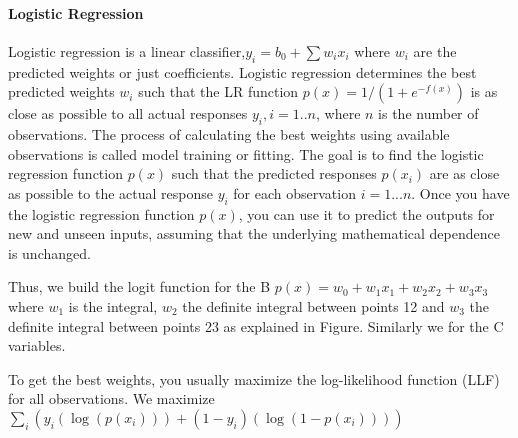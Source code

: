 \documentclass[11pt]{article}
\begin{document}
\paragraph*{Logistic Regression }
Logistic regression is a linear classifier,$y_i = b_0 + \sum w_i x_i $ where $w_i$ are the predicted weights or just coefficients.
Logistic regression determines the best predicted weights $w_i$ such that the LR function $p(x) = 1/(1 + e^{-f(x)})$ is as close as possible to all actual responses $y_i, i=1..n$, where $n$ is the number of observations. 
The process of calculating the best weights using available observations is called model training or fitting.
The goal is to find the logistic regression function $p(x)$ such that the predicted responses $p(x_i)$ are as close as possible to the actual response $y_i$ for each observation $i = 1 ...n$. 
Once you have the logistic regression function $p(x)$, you can use it to predict the outputs for new and unseen inputs, assuming that the underlying mathematical dependence is unchanged.

Thus, we build the logit function for the B $p(x) = w_0 + w_1 x_1 + w_2 x_2 + w_3 x_3 $ where $w_1$ is the integral, $w_2$ the definite integral between points 12 and $w_3$ the definite integral between points 23 as explained in Figure. Similarly we for the C variables.

To get the best weights, you usually maximize the log-likelihood function (LLF) for all observations. We maximize $\sum_{i} (y_i(\log(p(x_i))) + (1-y_i)(\log(1 - p(x_i))))$ 





\end{document}
